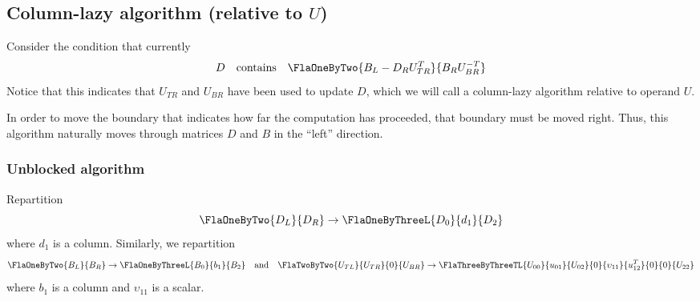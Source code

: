 \subsection{Column-lazy algorithm (relative to $ U $)}

Consider the condition that currently 
\begin{equation}
\label{eqn:utrsm2}
D \quad \mbox{contains}
\quad
\FlaOneByTwo{ B_{L} - D_{R} U_{TR}^{T} }
            { B_{R} U_{BR}^{-T}        }
\end{equation}
Notice that this indicates that 
$ U_{TR} $ and $ U_{BR} $ have been used
to update $ D $, which we will call
a column-lazy algorithm relative to operand
$ U $.

In order to move the boundary that indicates
how far the computation has proceeded, 
that boundary must be moved right.
Thus, this algorithm naturally moves through
matrices $ D $ and $ B $ in the ``left'' direction.

\subsubsection{Unblocked algorithm}

Repartition 
\[
  \FlaOneByTwo{ D_{L} }
              { D_{R} } \rightarrow
  \FlaOneByThreeL{ D_{0} } 
                 { d_{1} }
                 { D_{2} }
\]
where
$ d_{1} $ is a column.
Similarly, we repartition 
\[ 
  \FlaOneByTwo{ B_{L} }
              { B_{R} } \rightarrow
  \FlaOneByThreeL{ B_{0} }
                 { b_{1} }
                 { B_{2} }
\quad \mbox{and} \quad
      \FlaTwoByTwo{ U_{TL} }{ U_{TR} }
                  {   0    }{ U_{BR} } \rightarrow
      \FlaThreeByThreeTL{ U_{00} } { u_{01}       } { U_{02}     }
                        {   0    } { \upsilon_{11}} { u_{12}^{T} }
                        {   0    } {    0         } { U_{22}     }  
\]
where $ b_{1} $ is a column and 
$ \upsilon_{11} $ is a scalar.

